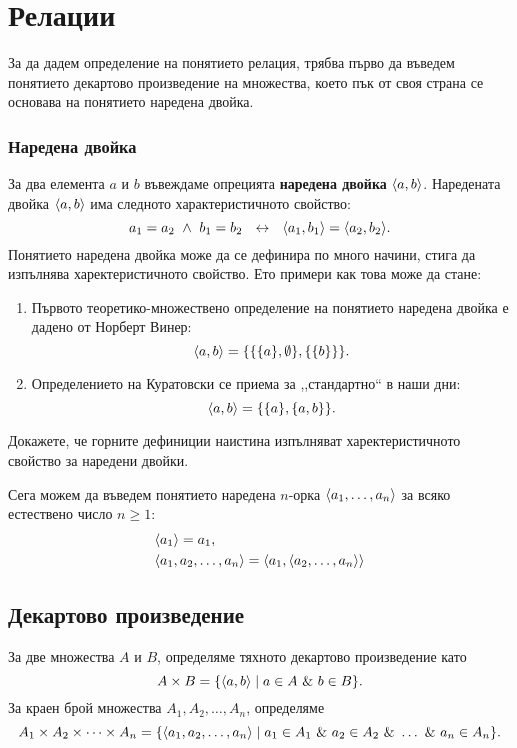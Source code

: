 \chapter{Релации}

За да дадем определение на понятието релация, трябва първо 
да въведем понятието декартово произведение на множества,
което пък от своя страна се основава на понятието наредена двойка.

\subsection*{Наредена двойка}

За два елемента $a$ и $b$ въвеждаме опрецията {\bf наредена двойка} $\langle{a,b}\rangle$.
Наредената двойка $\langle{a,b}\rangle$ има следното характеристичното свойство:
\[a_1 = a_2\ \wedge\ b_1 = b_2\ \iff\ \pair{a_1,b_1} = \pair{a_2,b_2}.\]
Понятието наредена двойка може да се дефинира по много начини, стига да изпълнява харектеристичното свойство.
Ето примери как това може да стане:
\begin{enumerate}[1)]
\item
  Първото теоретико-множествено определение на понятието наредена двойка е
  дадено от Норберт Винер:
  \[\langle{a,b}\rangle = \{\{\{a\},\emptyset\},\{\{b\}\}\}.\]
\item
  Определението на Куратовски се приема за ,,стандартно`` в наши дни:
  \[\langle{a,b}\rangle = \{\{a\},\{a,b\}\}.\]
\end{enumerate}

\begin{problem}
  Докажете, че горните дефиниции наистина изпълняват харектеристичното свойство за наредени двойки.
\end{problem}

\begin{remark}
  Сега можем да въведем понятието наредена $n$-орка $\langle{a_1,\dots,a_n}\rangle$ за всяко естествено число $n \geq 1$:
  \begin{align*}
    & \langle{a_1}\rangle = a_1,\\
    & \langle{a_1,a_2,\dots,a_n}\rangle = \langle{a_1,\langle{a_2,\dots,a_n}\rangle}\rangle
  \end{align*}
\end{remark}
 
\section{Декартово произведение}
За две множества $A$ и $B$, определяме тяхното декартово произведение като
\[A\times B = \{\langle{a,b}\rangle\mid a\in A\ \&\ b\in B\}.\]
За краен брой множества $A_1,A_2,\dots,A_n$, определяме
\[A_1\times A_2\times\cdots\times A_n = \{\pair{a_1,a_2,\dots,a_n}\mid a_1 \in A_1\ \&\ a_2\in A_2\ \&\ \dots\ \&\ a_n \in A_n\}.\]


